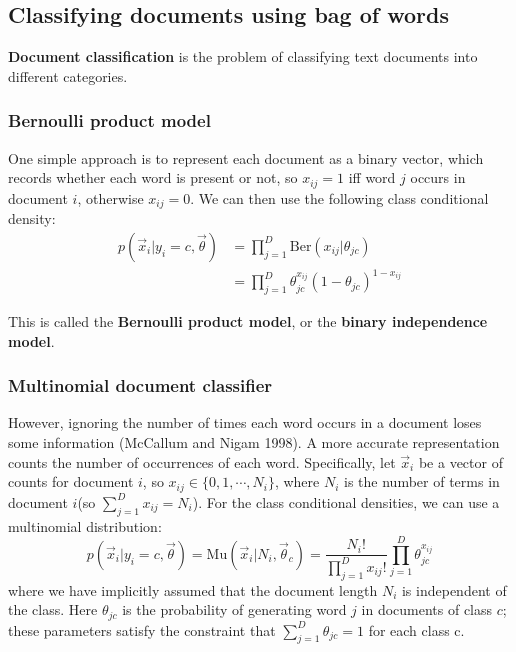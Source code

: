 \subsection{Classifying documents using bag of words}
\textbf{Document classification} is the problem of classifying text documents into different categories.


\subsubsection{Bernoulli product model}
One simple approach is to represent each document as a binary vector, which records whether each word is present or not, so $x_{ij} =1$ iff word $j$ occurs in document $i$, otherwise $x_{ij}=0$. We can then use the following class conditional density:
\begin{equation}\begin{split}
p(\vec{x}_i|y_i=c,\vec{\theta}) & =\prod\limits_{j=1}^D \mathrm{Ber}(x_{ij}|\theta_{jc}) \\
  & =\prod\limits_{j=1}^D \theta_{jc}^{x_{ij}}(1-\theta_{jc})^{1-x_{ij}}
\end{split}\end{equation}

This is called the \textbf{Bernoulli product model}, or the \textbf{binary independence model}.

\subsubsection{Multinomial document classifier}
However, ignoring the number of times each word occurs in a document loses some information (McCallum and Nigam 1998). A more accurate representation counts the number of occurrences of each word. Specifically, let $\vec{x}_i$ be a vector of counts for document $i$, so $x_{ij} \in \{0,1,\cdots,N_i\}$, where $N_i$ is the number of terms in document $i$(so $\sum\limits_{j=1}^D x_{ij}=N_i$). For the class conditional densities, we can use a multinomial distribution:
\begin{equation}\label{eqn:Multinomial-document-classifier}
p(\vec{x}_i|y_i=c,\vec{\theta})=\text{Mu}(\vec{x}_i|N_i,\vec{\theta}_c)=\dfrac{N_i!}{\prod_{j=1}^D x_{ij}!}\prod\limits_{j=1}^D \theta_{jc}^{x_{ij}}
\end{equation}
where we have implicitly assumed that the document length $N_i$ is independent of the class. Here $θ_{jc}$ is the probability of generating word $j$ in documents of class $c$; these parameters satisfy the constraint that $\sum_{j=1}^D \theta_{jc}=1$ for each class c.

